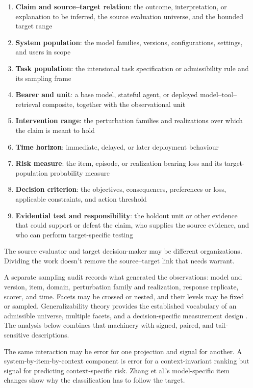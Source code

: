 \documentclass[12pt]{article}
\begin{document}
\begin{enumerate}
\item \textbf{Claim and source--target relation}: the outcome, interpretation, or explanation to be inferred, the source evaluation universe, and the bounded target range
\item \textbf{System population}: the model families, versions, configurations, settings, and users in scope
\item \textbf{Task population}: the intensional task specification or admissibility rule and its sampling frame
\item \textbf{Bearer and unit}: a base model, stateful agent, or deployed model--tool--retrieval composite, together with the observational unit
\item \textbf{Intervention range}: the perturbation families and realizations over which the claim is meant to hold
\item \textbf{Time horizon}: immediate, delayed, or later deployment behaviour
\item \textbf{Risk measure}: the item, episode, or realization bearing loss and its target-population probability measure
\item \textbf{Decision criterion}: the objectives, consequences, preferences or loss, applicable constraints, and action threshold
\item \textbf{Evidential test and responsibility}: the holdout unit or other evidence that could support or defeat the claim, who supplies the source evidence, and who can perform target-specific testing
\end{enumerate}

The source evaluator and target decision-maker may be different organizations. Dividing the work doesn't remove the source--target link that needs warrant.

A separate sampling audit records what generated the observations: model and version, item, domain, perturbation family and realization, response replicate, scorer, and time. Facets may be crossed or nested, and their levels may be fixed or sampled. Generalizability theory provides the established vocabulary of an admissible universe, multiple facets, and a decision-specific measurement design \citep{brennan2001generalizability}. The analysis below combines that machinery with signed, paired, and tail-sensitive descriptions.

The same interaction may be error for one projection and signal for another. A system-by-item-by-context component is error for a context-invariant ranking but signal for predicting context-specific risk. Zhang et al.'s model-specific item changes show why the classification has to follow the target.
\end{document}

